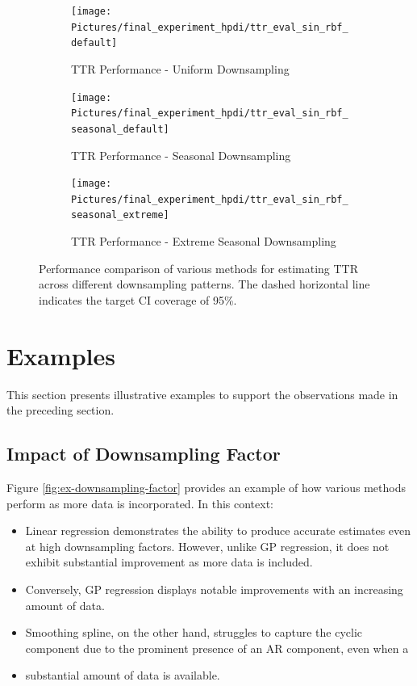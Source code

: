 \begin{figure}[!htb]
\centering
\begin{subfigure}{\textwidth}
    \centering
    \texttt{[image: Pictures/final\_experiment\_hpdi/ttr\_eval\_sin\_rbf\_default]}
    \caption{TTR Performance - Uniform Downsampling}
    \label{fig:ttr-uniform-sampling-performance}
\end{subfigure}

\bigskip

\begin{subfigure}{\textwidth}
    \centering
    \texttt{[image: Pictures/final\_experiment\_hpdi/ttr\_eval\_sin\_rbf\_seasonal\_default]}
    \caption{TTR Performance - Seasonal Downsampling}
    \label{fig:ttr-seasonal-sampling-performance}
\end{subfigure}

\bigskip

\begin{subfigure}{\textwidth}
    \centering
    \texttt{[image: Pictures/final\_experiment\_hpdi/ttr\_eval\_sin\_rbf\_seasonal\_extreme]}
    \caption{TTR Performance - Extreme Seasonal Downsampling}
    \label{fig:ttr-extreme-seasonal-sampling-performance}
\end{subfigure}

\caption[TTR Performance]{Performance comparison of various methods for
estimating TTR across different downsampling patterns.
The dashed horizontal line indicates the target CI coverage of 95\%.
}
\label{fig:ttr-performance}
\end{figure}


\section{Examples}
This section presents illustrative examples to support the observations made in
the preceding section.


\subsection{Impact of Downsampling Factor}


Figure \ref{fig:ex-downsampling-factor} provides an example of how various
methods perform as more data is incorporated. In this context:

\begin{itemize}
    \item Linear regression demonstrates the ability to produce accurate estimates even
    at high downsampling factors. However, unlike GP regression, it does not exhibit
    substantial improvement as more data is included.
    \item Conversely, GP regression displays notable improvements with an
    increasing amount of data.
    \item Smoothing spline, on the other hand, struggles to capture the cyclic
    component due to the prominent presence of an AR component, even when a
    \item substantial amount of data is available.
\end{itemize}

